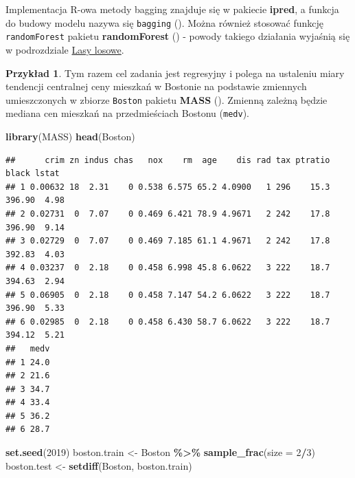 \documentclass[
]{book}
\newenvironment{Shaded}{\begin{snugshade}}{\end{snugshade}}
\newcommand{\AttributeTok}[1]{\textcolor[rgb]{0.13,0.29,0.53}{#1}}
\newcommand{\DecValTok}[1]{\textcolor[rgb]{0.00,0.00,0.81}{#1}}
\newcommand{\FunctionTok}[1]{\textcolor[rgb]{0.13,0.29,0.53}{\textbf{#1}}}
\newcommand{\NormalTok}[1]{#1}
\newcommand{\OtherTok}[1]{\textcolor[rgb]{0.56,0.35,0.01}{#1}}
\newcommand{\SpecialCharTok}[1]{\textcolor[rgb]{0.81,0.36,0.00}{\textbf{#1}}}
\theoremstyle{plain}
\theoremstyle{definition}
\theoremstyle{definition}
\theoremstyle{definition}
\newtheorem{example}{Przykład}[chapter]
\theoremstyle{definition}
\theoremstyle{definition}
\theoremstyle{remark}
\begin{document}
Implementacja R-owa metody bagging znajduje się w pakiecie \textbf{ipred}, a funkcja do budowy modelu nazywa się \texttt{bagging} (). Można również stosować funkcję \texttt{randomForest} pakietu \textbf{randomForest} () - powody takiego działania wyjaśnią się w podrozdziale \hyperref[lasy-losowe]{Lasy losowe}.

\begin{example}
\protect\hypertarget{exm:przyk51}{}\label{exm:przyk51}Tym razem cel zadania jest regresyjny i polega na ustaleniu miary tendencji centralnej ceny mieszkań w Bostonie na podstawie zmiennych umieszczonych w zbiorze \texttt{Boston} pakietu \textbf{MASS} (). Zmienną zależną będzie mediana cen mieszkań na przedmieściach Bostonu (\texttt{medv}).
\end{example}

\begin{Shaded}
\begin{Highlighting}[]
\FunctionTok{library}\NormalTok{(MASS)}
\FunctionTok{head}\NormalTok{(Boston)}
\end{Highlighting}
\end{Shaded}

\begin{verbatim}
##      crim zn indus chas   nox    rm  age    dis rad tax ptratio  black lstat
## 1 0.00632 18  2.31    0 0.538 6.575 65.2 4.0900   1 296    15.3 396.90  4.98
## 2 0.02731  0  7.07    0 0.469 6.421 78.9 4.9671   2 242    17.8 396.90  9.14
## 3 0.02729  0  7.07    0 0.469 7.185 61.1 4.9671   2 242    17.8 392.83  4.03
## 4 0.03237  0  2.18    0 0.458 6.998 45.8 6.0622   3 222    18.7 394.63  2.94
## 5 0.06905  0  2.18    0 0.458 7.147 54.2 6.0622   3 222    18.7 396.90  5.33
## 6 0.02985  0  2.18    0 0.458 6.430 58.7 6.0622   3 222    18.7 394.12  5.21
##   medv
## 1 24.0
## 2 21.6
## 3 34.7
## 4 33.4
## 5 36.2
## 6 28.7
\end{verbatim}

\begin{Shaded}
\begin{Highlighting}[]
\FunctionTok{set.seed}\NormalTok{(}\DecValTok{2019}\NormalTok{)}
\NormalTok{boston.train }\OtherTok{\textless{}{-}}\NormalTok{ Boston }\SpecialCharTok{\%\textgreater{}\%} 
    \FunctionTok{sample\_frac}\NormalTok{(}\AttributeTok{size =} \DecValTok{2}\SpecialCharTok{/}\DecValTok{3}\NormalTok{)}
\NormalTok{boston.test }\OtherTok{\textless{}{-}} \FunctionTok{setdiff}\NormalTok{(Boston, boston.train)}
\end{Highlighting}
\end{Shaded}
\end{document}
